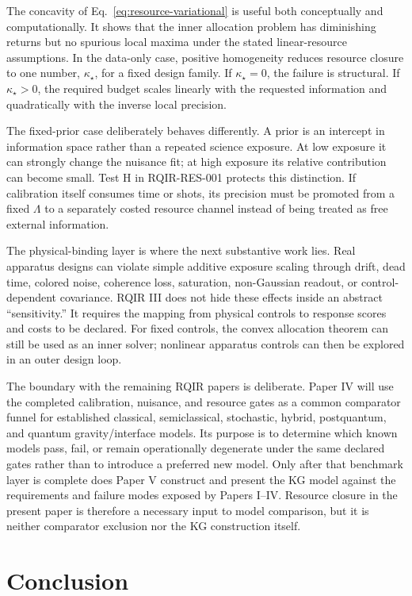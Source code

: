 The concavity of Eq.~\eqref{eq:resource-variational} is useful both conceptually and computationally. It shows that the inner allocation problem has diminishing returns but no spurious local maxima under the stated linear-resource assumptions. In the data-only case, positive homogeneity reduces resource closure to one number, $\kappa_\star$, for a fixed design family. If $\kappa_\star=0$, the failure is structural. If $\kappa_\star>0$, the required budget scales linearly with the requested information and quadratically with the inverse local precision.

The fixed-prior case deliberately behaves differently. A prior is an intercept in information space rather than a repeated science exposure. At low exposure it can strongly change the nuisance fit; at high exposure its relative contribution can become small. Test H in RQIR-RES-001 protects this distinction. If calibration itself consumes time or shots, its precision must be promoted from a fixed $\Lambda$ to a separately costed resource channel instead of being treated as free external information.

The physical-binding layer is where the next substantive work lies. Real apparatus designs can violate simple additive exposure scaling through drift, dead time, colored noise, coherence loss, saturation, non-Gaussian readout, or control-dependent covariance. RQIR III does not hide these effects inside an abstract ``sensitivity.'' It requires the mapping from physical controls to response scores and costs to be declared. For fixed controls, the convex allocation theorem can still be used as an inner solver; nonlinear apparatus controls can then be explored in an outer design loop.

The boundary with the remaining RQIR papers is deliberate. Paper IV will use the completed calibration, nuisance, and resource gates as a common comparator funnel for established classical, semiclassical, stochastic, hybrid, postquantum, and quantum gravity/interface models. Its purpose is to determine which known models pass, fail, or remain operationally degenerate under the same declared gates rather than to introduce a preferred new model. Only after that benchmark layer is complete does Paper V construct and present the KG model against the requirements and failure modes exposed by Papers I--IV. Resource closure in the present paper is therefore a necessary input to model comparison, but it is neither comparator exclusion nor the KG construction itself.

\section{Conclusion}
\label{sec:conclusion}

